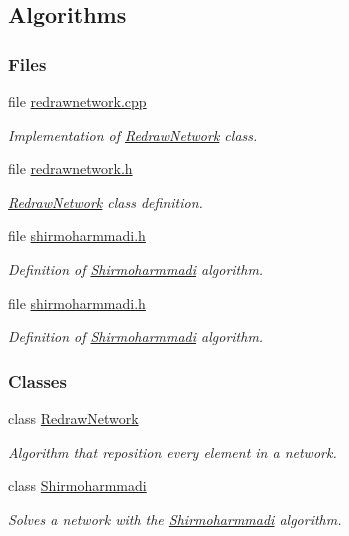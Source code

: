 \hypertarget{group___algorithms}{}\subsection{Algorithms}
\label{group___algorithms}
\subsubsection*{Files}
\begin{DoxyCompactItemize}
\item 
file \hyperlink{redrawnetwork_8cpp}{redrawnetwork.\+cpp}
\begin{DoxyCompactList}\small\item\em Implementation of \hyperlink{class_redraw_network}{Redraw\+Network} class. \end{DoxyCompactList}\item 
file \hyperlink{redrawnetwork_8h}{redrawnetwork.\+h}
\begin{DoxyCompactList}\small\item\em \hyperlink{class_redraw_network}{Redraw\+Network} class definition. \end{DoxyCompactList}\item 
file \hyperlink{shirmoharmmadi_8h}{shirmoharmmadi.\+h}
\begin{DoxyCompactList}\small\item\em Definition of \hyperlink{class_shirmoharmmadi}{Shirmoharmmadi} algorithm. \end{DoxyCompactList}\item 
file \hyperlink{shirmoharmmadi_8h}{shirmoharmmadi.\+h}
\begin{DoxyCompactList}\small\item\em Definition of \hyperlink{class_shirmoharmmadi}{Shirmoharmmadi} algorithm. \end{DoxyCompactList}\end{DoxyCompactItemize}
\subsubsection*{Classes}
\begin{DoxyCompactItemize}
\item 
class \hyperlink{class_redraw_network}{Redraw\+Network}
\begin{DoxyCompactList}\small\item\em Algorithm that reposition every element in a network. \end{DoxyCompactList}\item 
class \hyperlink{class_shirmoharmmadi}{Shirmoharmmadi}
\begin{DoxyCompactList}\small\item\em Solves a network with the \hyperlink{class_shirmoharmmadi}{Shirmoharmmadi} algorithm. \end{DoxyCompactList}\end{DoxyCompactItemize}
